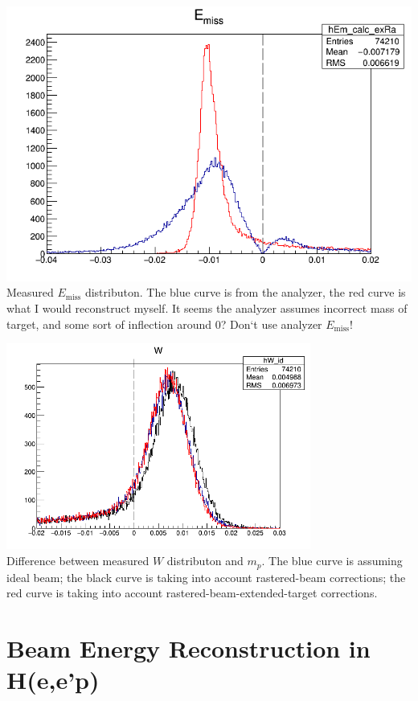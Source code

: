 \documentclass{article}
\begin{document}
\begin{center}
\includegraphics[width=14cm]{Em.png}\\
Measured $E_{\textrm{miss}}$ distributon. The blue curve is from the analyzer, the red curve is what I would reconstruct myself. It seems the analyzer assumes incorrect mass of target, and some sort of inflection around 0? Don`t use analyzer $E_\textrm{miss}$!
\end{center}

\begin{center}
\includegraphics[width=10cm]{delW.png}\\
Difference between measured $W$ distributon and $m_p$. The blue curve is assuming ideal beam; the black curve is taking into account rastered-beam corrections; the red curve is taking into account rastered-beam-extended-target corrections.
\end{center}

\section*{Beam Energy Reconstruction in H(e,e'p)}
\end{document}
